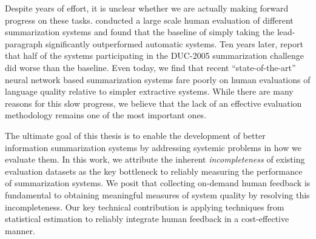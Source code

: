 Despite years of effort, it is unclear whether we are actually making forward progress on these tasks.
\citet{brandow1995automatic} conducted a large scale human evaluation of different summarization systems and found that the baseline of simply taking the lead-paragraph significantly outperformed automatic systems. 
Ten years later, \citet{passonneau2005applying} report that half of the systems participating in the DUC-2005 summarization challenge did worse than the baseline.
Even today, we find that recent ``state-of-the-art'' neural network based summarization systems fare poorly on human evaluations of language quality relative to simpler extractive systems.
While there are many reasons for this slow progress, we believe that the lack of an effective evaluation methodology remains one of the most important ones.

The ultimate goal of this thesis is to enable the development of better information summarization systems by addressing systemic problems in how we evaluate them.
In this work, we attribute the inherent \textit{incompleteness} of existing evaluation datasets as the key bottleneck to reliably measuring the performance of summarization systems.
We posit that collecting on-demand human feedback is fundamental to obtaining meaningful measures of system quality by resolving this incompleteness.
Our key technical contribution is applying techniques from statistical estimation to reliably integrate human feedback in a cost-effective manner.

